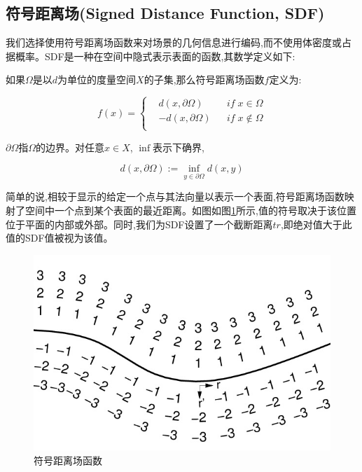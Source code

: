 \subsection{符号距离场(Signed Distance Function, SDF)}
我们选择使用符号距离场函数\cite{sdf}来对场景的几何信息进行编码,而不使用体密度或占据概率。SDF是一种在空间中隐式表示表面的函数,其数学定义如下:

如果$\Omega$是以$d$为单位的度量空间$X$的子集,那么符号距离场函数$f$定义为:

$$f(x) = \left\{
\begin{aligned}
&d(x,\partial\Omega)&&if\; x\in\Omega \\
&-d(x,\partial\Omega)&&if\; x\notin\Omega\\
\end{aligned}
\right.
$$

$\partial\Omega$指$\Omega$的边界。对任意$x\in X$, $\inf$表示下确界,

$$
d(x,\partial\Omega) := \inf_{y\in \partial\Omega}d(x,y)
$$

简单的说,相较于显示的给定一个点与其法向量以表示一个表面,符号距离场函数映射了空间中一个点到某个表面的最近距离。如图如图\ref{sdf_figure}所示,值的符号取决于该位置位于平面的内部或外部。同时,我们为SDF设置了一个截断距离$tr$,即绝对值大于此值的SDF值被视为该值。
\begin{figure}[htbp]
    \centering
    \includegraphics[scale=0.3]{figures/sdf_figure.jpeg}
    \caption{符号距离场函数}\label{sdf_figure}
\end{figure}

